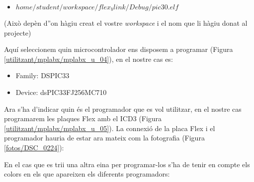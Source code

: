 \begin{itemize}
	\item $home/student/workspace/flex_blink/Debug/pic30.elf$
\end{itemize}

(Això depèn d''on hàgiu creat el vostre \emph{workspace} i el nom que li hàgiu donat al projecte)


Aquí seleccionem quin microcontrolador ens disposem a programar (Figura \ref{utilitzant/mplabx/mplabx_u_04}), en el nostre cas es:

\begin{itemize}
	\item Family: DSPIC33
	\item Device: dsPIC33FJ256MC710
\end{itemize}


Ara s'ha d'indicar quin és el programador que es vol utilitzar, en el nostre cas programarem les plaques Flex amb el ICD3 (Figura \ref{utilitzant/mplabx/mplabx_u_05}).
La connexió de la placa Flex i el programador hauria de estar ara mateix com la fotografia (Figura \ref{fotos/DSC_0224}):


En el cas que es trii una altra eina per programar-los s'ha de tenir en compte els colors en els que apareixen els diferents programadors:







